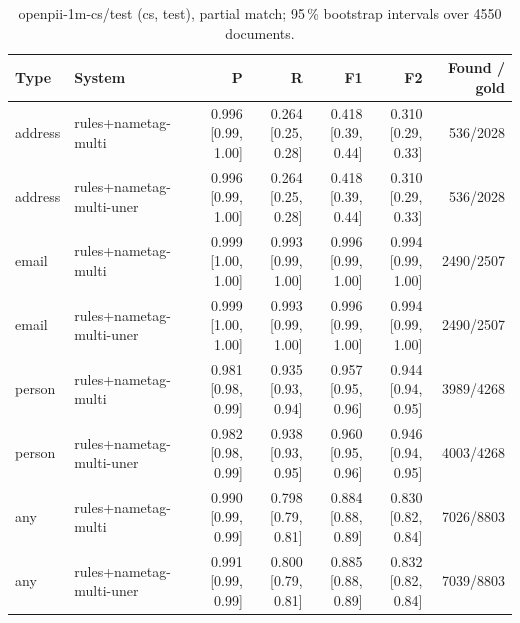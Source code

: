 \providecommand{\ci}[2]{{\scriptsize [#1, #2]}}

\begin{table}[htbp]
\centering
\small
\begin{tabular}{llrrrrr}
\toprule
Type & System & P & R & F1 & F2 & Found / gold \\
\midrule
address & rules+nametag-multi & 0.996 \ci{0.99}{1.00} & 0.264 \ci{0.25}{0.28} & 0.418 \ci{0.39}{0.44} & 0.310 \ci{0.29}{0.33} & 536/2028 \\
address & rules+nametag-multi-uner & 0.996 \ci{0.99}{1.00} & 0.264 \ci{0.25}{0.28} & 0.418 \ci{0.39}{0.44} & 0.310 \ci{0.29}{0.33} & 536/2028 \\
email & rules+nametag-multi & 0.999 \ci{1.00}{1.00} & 0.993 \ci{0.99}{1.00} & 0.996 \ci{0.99}{1.00} & 0.994 \ci{0.99}{1.00} & 2490/2507 \\
email & rules+nametag-multi-uner & 0.999 \ci{1.00}{1.00} & 0.993 \ci{0.99}{1.00} & 0.996 \ci{0.99}{1.00} & 0.994 \ci{0.99}{1.00} & 2490/2507 \\
person & rules+nametag-multi & 0.981 \ci{0.98}{0.99} & 0.935 \ci{0.93}{0.94} & 0.957 \ci{0.95}{0.96} & 0.944 \ci{0.94}{0.95} & 3989/4268 \\
person & rules+nametag-multi-uner & 0.982 \ci{0.98}{0.99} & 0.938 \ci{0.93}{0.95} & 0.960 \ci{0.95}{0.96} & 0.946 \ci{0.94}{0.95} & 4003/4268 \\
any & rules+nametag-multi & 0.990 \ci{0.99}{0.99} & 0.798 \ci{0.79}{0.81} & 0.884 \ci{0.88}{0.89} & 0.830 \ci{0.82}{0.84} & 7026/8803 \\
any & rules+nametag-multi-uner & 0.991 \ci{0.99}{0.99} & 0.800 \ci{0.79}{0.81} & 0.885 \ci{0.88}{0.89} & 0.832 \ci{0.82}{0.84} & 7039/8803 \\
\bottomrule
\end{tabular}
\caption{openpii-1m-cs/test (cs, test), partial match; 95\,\% bootstrap intervals over 4550 documents.}
\label{tab:rq6-test-home-posthoc-uner-openpii-1m-cs-test-partial}
\end{table}

